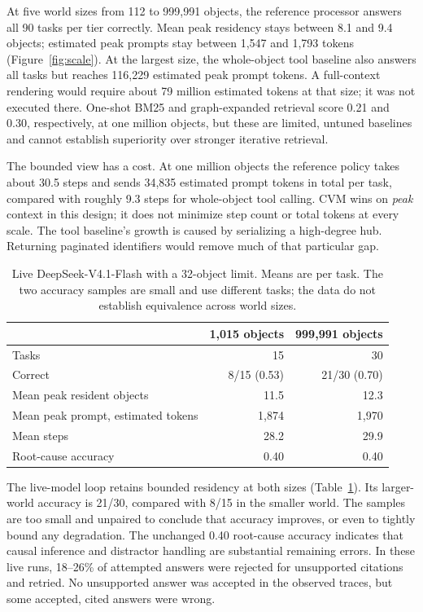 \documentclass[10pt,letterpaper]{article}
\begin{document}
At five world sizes from 112 to 999,991 objects, the reference processor answers all 90 tasks per tier correctly. Mean peak residency stays between 8.1 and 9.4 objects; estimated peak prompts stay between 1,547 and 1,793 tokens (Figure~\ref{fig:scale}). At the largest size, the whole-object tool baseline also answers all tasks but reaches 116,229 estimated peak prompt tokens. A full-context rendering would require about 79 million estimated tokens at that size; it was not executed there. One-shot BM25 and graph-expanded retrieval score 0.21 and 0.30, respectively, at one million objects, but these are limited, untuned baselines and cannot establish superiority over stronger iterative retrieval.

The bounded view has a cost. At one million objects the reference policy takes about 30.5 steps and sends 34,835 estimated prompt tokens in total per task, compared with roughly 9.3 steps for whole-object tool calling. CVM wins on \emph{peak} context in this design; it does not minimize step count or total tokens at every scale. The tool baseline's growth is caused by serializing a high-degree hub. Returning paginated identifiers would remove much of that particular gap.

\begin{table}[t]
\centering\small
\caption{Live DeepSeek-V4.1-Flash with a 32-object limit. Means are per task. The two accuracy samples are small and use different tasks; the data do not establish equivalence across world sizes.}
\label{tab:live}
\begin{tabular}{lrr}
\toprule
 & 1,015 objects & 999,991 objects\\
\midrule
Tasks & 15 & 30\\
Correct & 8/15 (0.53) & 21/30 (0.70)\\
Mean peak resident objects & 11.5 & 12.3\\
Mean peak prompt, estimated tokens & 1,874 & 1,970\\
Mean steps & 28.2 & 29.9\\
Root-cause accuracy & 0.40 & 0.40\\
\bottomrule
\end{tabular}
\end{table}

The live-model loop retains bounded residency at both sizes (Table~\ref{tab:live}). Its larger-world accuracy is 21/30, compared with 8/15 in the smaller world. The samples are too small and unpaired to conclude that accuracy improves, or even to tightly bound any degradation. The unchanged 0.40 root-cause accuracy indicates that causal inference and distractor handling are substantial remaining errors. In these live runs, 18--26\% of attempted answers were rejected for unsupported citations and retried. No unsupported answer was accepted in the observed traces, but some accepted, cited answers were wrong.
\end{document}
